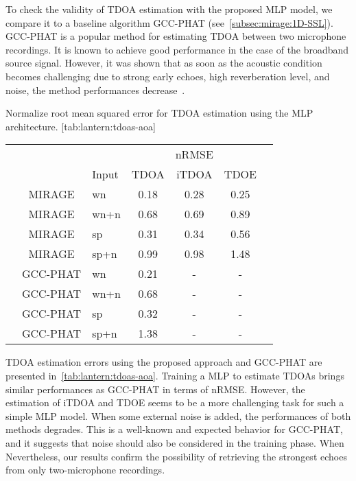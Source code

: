 \label{subsec:lantern:mlpdata}
To check the validity of \ac{TDOA} estimation with the proposed \ac{MLP} model, we compare it to a baseline algorithm \acf{GCC-PHAT} (see~\cref{subsec:mirage:1D-SSL}).
\ac{GCC-PHAT} is a popular method for estimating \ac{TDOA} between two microphone recordings.
It is known to achieve good performance in the case of the broadband source signal.
However, it was shown that as soon as the acoustic condition becomes challenging due to strong early echoes, high reverberation level, and noise, the method performances decrease~.

\begin{table}[h]
    \begin{sidecaption}{%
        Normalize root mean squared error for TDOA estimation using the \ac{MLP} architecture.
    }[tab:lantern:tdoas-aoa]
    \centering
    \footnotesize
    \small
    \begin{tabular*}{\linewidth}{@{\extracolsep{\fill}}lcl|cccc@{}}
    \toprule
    &            &         &          & nRMSE           &\\
    &            & Input   &    \ac{TDOA}  	&   \ac{iTDOA} 		 &     \ac{TDOE}   	&\\
    \midrule
    & MIRAGE      &   wn    & 0.18    & 0.28  & 0.25 	& \\
    & MIRAGE      &   wn+n  & 0.68    & 0.69  & 0.89 	& \\
    & MIRAGE      &   sp    & 0.31    & 0.34  & 0.56    & \\
    & MIRAGE      &   sp+n  & 0.99    & 0.98  & 1.48 	& \\
    & GCC-PHAT    &   wn    & 0.21    & -     & -		& \\
    & GCC-PHAT    &   wn+n  & 0.68    & -     & -		& \\
    & GCC-PHAT    &   sp 	& 0.32    & -     & -		& \\
    & GCC-PHAT    &   sp+n  & 1.38    & -     & -		& \\
    \bottomrule
    \end{tabular*}
    \end{sidecaption}
\end{table}

\mynewline
\ac{TDOA} estimation errors using the proposed approach and \ac{GCC-PHAT} are presented in~\cref{tab:lantern:tdoas-aoa}.
Training a \ac{MLP} to estimate \acp{TDOA} brings similar performances as \ac{GCC-PHAT} in terms of nRMSE.
However, the estimation of \ac{iTDOA} and \ac{TDOE} seems to be a more challenging task for such a simple \ac{MLP} model.
When some external noise is added, the performances of both methods degrades.
This is a well-known and expected behavior for \ac{GCC-PHAT}, and it suggests that noise should also be considered in the training phase. When
Nevertheless, our results confirm the possibility of retrieving the strongest echoes from only two-microphone recordings.

